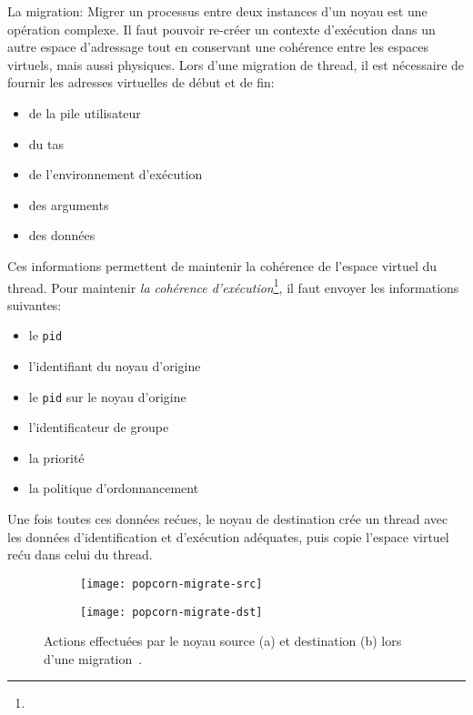       \begin{paragraph}{La migration: }
        Migrer un processus entre deux instances d'un noyau est une opération
        complexe. Il faut pouvoir re-créer un contexte d'exécution dans un autre
        espace d'adressage tout en conservant une cohérence entre les espaces
        virtuels, mais aussi physiques. Lors d'une migration de thread, il est
        nécessaire de fournir les adresses virtuelles de début et de fin:
        \begin{itemize}
          \item de la pile utilisateur
          \item du tas
          \item de l'environnement d'exécution
          \item des arguments
          \item des données
        \end{itemize}
        Ces informations permettent de maintenir la cohérence de l'espace
        virtuel du thread. Pour maintenir \textit{la cohérence
          d'exécution}\footnote{}, il faut envoyer les informations suivantes:
        \begin{itemize}
          \item le \texttt{pid}
          \item l'identifiant du noyau d'origine
          \item le \texttt{pid} sur le noyau d'origine
          \item l'identificateur de groupe
          \item la priorité
          \item la politique d'ordonnancement
        \end{itemize}
        Une fois toutes ces données rećues, le noyau de destination crée un
        thread avec les données d'identification et d'exécution adéquates, puis
        copie l'espace virtuel reću dans celui du thread.

        \begin{figure}[ht]
          \begin{subfigure}[b]{0.45\textwidth}
            \texttt{[image: popcorn-migrate-src]}
            \caption{}
            \label{fig:popcorn-migrate-src}
          \end{subfigure}
          \begin{subfigure}[b]{0.5\textwidth}
            \texttt{[image: popcorn-migrate-dst]}
            \caption{}
            \label{fig:popcorn-migrate-dst}
          \end{subfigure}
          \caption{Actions effectuées par le noyau source (a) et destination (b)
            lors d'une migration~\citep{katz2013popcorn}.}
        \end{figure}

      \end{paragraph}

